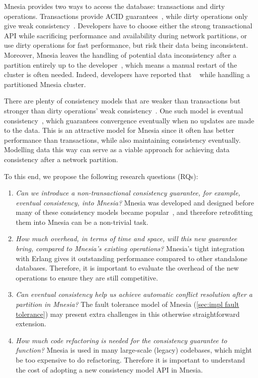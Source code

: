 Mnesia provides two ways to access the database: transactions
and dirty operations. Transactions provide ACID guarantees~\cite{haerder1983dbtransaction}, 
while dirty operations only give weak consistency~\cite{vogels2008ec}. Developers 
have to choose either the
strong transactional API while sacrificing performance and availability during
network partitions, or use dirty operations for fast performance, but risk their
data being inconsistent.  Moreover, Mnesia leaves the handling of potential
data inconsistency after a partition entirely up to the 
developer~\cite{ericssonab2023mnesiaguide}, which means a manual 
restart of the cluster is often needed. Indeed, developers have reported that
~\cite{mineiro2008DukesofErl} 
while handling a partitioned Mnesia cluster. 


There are plenty of consistency models that are weaker than transactions but stronger
than dirty operations' weak consistency~\cite{ericssonab2023mnesiaref}. 
One such model is eventual consistency~\cite{vogels2008ec}, which
guarantees convergence eventually when no updates are made to the data. This is an attractive
model for Mnesia since it often has better performance than transactions, while
also maintaining consistency eventually. Modelling data this way can serve
as a viable approach for achieving data consistency after a network partition.

To this end, we propose the following research questions (RQs):

\begin{enumerate}[label={RQ\arabic*.},ref={RQ\arabic*}]
  \item \emph{Can we introduce a non-transactional consistency guarantee, for example,
  eventual consistency, into Mnesia?} Mnesia was developed and designed before many
  of these consistency models became popular~\cite{mattsson1998mnesia}, and therefore 
  retrofitting them into Mnesia can be a non-trivial task.  \label{itm:question ec possible}
  \item \emph{How much overhead, in terms of time and space, will this new guarantee
  bring, compared to Mnesia's existing operations?} Mnesia's tight integration with
  Erlang gives it outstanding performance compared to other standalone databases.
  Therefore, it is important to evaluate the overhead of the new operations to
  ensure they are still competitive. \label{itm:question ec overhead}
  \item \emph{Can eventual consistency help us achieve automatic conflict resolution
  after a partition in Mnesia?} The fault tolerance model of 
  Mnesia (\cref{sec:impl fault tolerance}) may present extra challenges in this 
  otherwise straightforward extension. \label{itm:question ec conflict}
  \item \emph{How much code refactoring is needed for the consistency guarantee to
  function?} Mnesia is used in many large-scale (legacy) codebases, which might
  be too expensive to do refactoring. Therefore it is important to understand 
  the cost of adopting a new consistency model API in Mnesia.  
  \label{itm:question ec refactor}
\end{enumerate}


